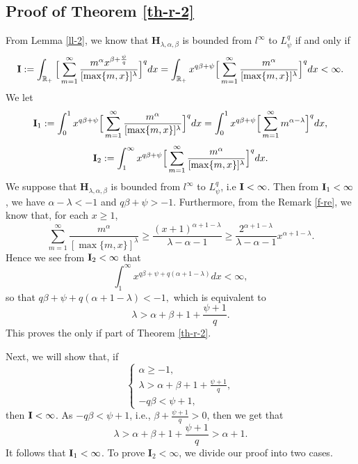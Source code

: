 \documentclass[10pt]{amsart}
\theoremstyle{definition}    %
\numberwithin{equation}{section}
\begin{document}
\subsection{{\bf Proof of Theorem \ref{th-r-2}}}
From Lemma \ref{ll-2}, we know that $\mathbf{H}_{\lambda, \alpha, \beta}$ is bounded from $l^{\infty}$ to $L_{\psi}^{q}$ if and only if 
\begin{equation}
{\bf I}:=\int_{\mathbb{R}_{+}}\Big[\sum_{m=1}^{\infty}\frac{m^{\alpha}x^{\beta+\frac{\psi}{q}}}{[\max\{m,x\}]^{\lambda}}\Big]^q dx=
\int_{\mathbb{R}_{+}}x^{q\beta+\psi}\Big[\sum_{m=1}^{\infty}\frac{m^{\alpha}}{[\max\{m,x\}]^{\lambda}}\Big]^q dx<\infty. \nonumber
\end{equation}
We let
$${\bf I}_1:=\int_{0}^{1}x^{q\beta+\psi}\Big[\sum_{m=1}^{\infty}\frac{m^{\alpha}}{[\max\{m,x\}]^{\lambda}}\Big]^qdx=\int_{0}^{1}x^{q\beta+\psi}\Big[\sum_{m=1}^{\infty}m^{\alpha-\lambda}\Big]^q dx,$$
$${\bf I}_2:=\int_{1}^{\infty}x^{q\beta+\psi}\Big[\sum_{m=1}^{\infty}\frac{m^{\alpha}}{[\max\{m,x\}]^{\lambda}}\Big]^q dx.$$
We suppose that $\mathbf{H}_{\lambda, \alpha, \beta}$ is bounded from $l^{\infty}$ to $L_{\psi}^{q}$, i.e ${\bf I}<\infty$. Then from ${\bf I}_1<\infty$, we have $\alpha-\lambda<-1$ and $q\beta+\psi>-1$.   
Furthermore, from the Remark \ref{f-re}, we know that, for each $x\geq 1$, 
\begin{equation}
\sum_{m=1}^{\infty}\frac{m^{\alpha}}{[\max\{m,x\}]^{\lambda}}\geq \frac{(x+1)^{\alpha+1-\lambda}}{\lambda-\alpha-1}\geq \frac{2^{\alpha+1-\lambda}}{\lambda-\alpha-1}x^{\alpha+1-\lambda}. \nonumber
\end{equation}
Hence we see from ${\bf I}_2<\infty$ that 
$$\int_{1}^{\infty}x^{q\beta+\psi+q(\alpha+1-\lambda)}dx<\infty,$$
so that $q\beta+\psi+q(\alpha+1-\lambda)<-1,$ which is equivalent to 
$$\lambda>\alpha+\beta+1+\frac{\psi+1}{q}.$$ This proves the only if part of Theorem \ref{th-r-2}.

Next, we will show that, if \begin{equation}\label{jia-1}
\begin{cases}
\alpha\geq -1,\\
\lambda>\alpha+\beta+1+\frac{\psi+1}{q}, \\
-q\beta<\psi+1, 
\end{cases}
\end{equation}
then ${\bf I}<\infty$. As $-q\beta<\psi+1$, i.e., $\beta+\frac{\psi+1}{q}>0$, then we get that
$$\lambda>\alpha+\beta+1+\frac{\psi+1}{q}>\alpha+1.$$
It follows that ${\bf I}_1<\infty$.  To prove $\mathbf{I}_2<\infty$, we divide our proof into two cases.
\end{document}
